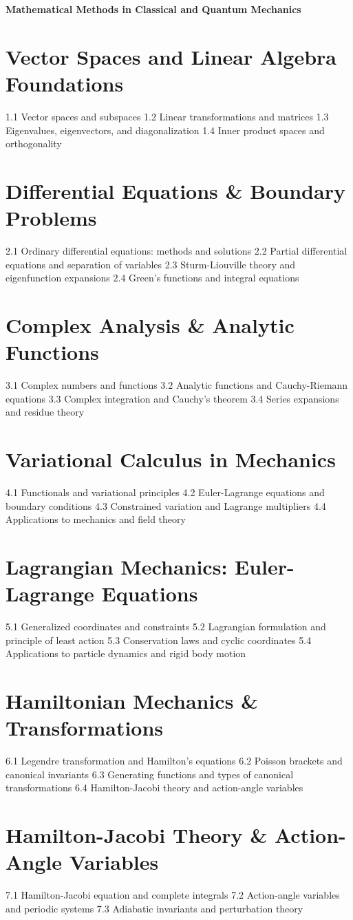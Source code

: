 {\LARGE \bf{Mathematical Methods in Classical and Quantum Mechanics}}
\section{Vector Spaces and Linear Algebra Foundations}
1.1 Vector spaces and subspaces
1.2 Linear transformations and matrices
1.3 Eigenvalues, eigenvectors, and diagonalization
1.4 Inner product spaces and orthogonality
\section{Differential Equations \& Boundary Problems}
2.1 Ordinary differential equations: methods and solutions
2.2 Partial differential equations and separation of variables
2.3 Sturm-Liouville theory and eigenfunction expansions
2.4 Green's functions and integral equations
\section{Complex Analysis \& Analytic Functions}
3.1 Complex numbers and functions
3.2 Analytic functions and Cauchy-Riemann equations
3.3 Complex integration and Cauchy's theorem
3.4 Series expansions and residue theory
\section{Variational Calculus in Mechanics}
4.1 Functionals and variational principles
4.2 Euler-Lagrange equations and boundary conditions
4.3 Constrained variation and Lagrange multipliers
4.4 Applications to mechanics and field theory
\section{Lagrangian Mechanics: Euler-Lagrange Equations}
5.1 Generalized coordinates and constraints
5.2 Lagrangian formulation and principle of least action
5.3 Conservation laws and cyclic coordinates
5.4 Applications to particle dynamics and rigid body motion
\section{Hamiltonian Mechanics \& Transformations}
6.1 Legendre transformation and Hamilton's equations
6.2 Poisson brackets and canonical invariants
6.3 Generating functions and types of canonical transformations
6.4 Hamilton-Jacobi theory and action-angle variables
\section{Hamilton-Jacobi Theory \& Action-Angle Variables}
7.1 Hamilton-Jacobi equation and complete integrals
7.2 Action-angle variables and periodic systems
7.3 Adiabatic invariants and perturbation theory
